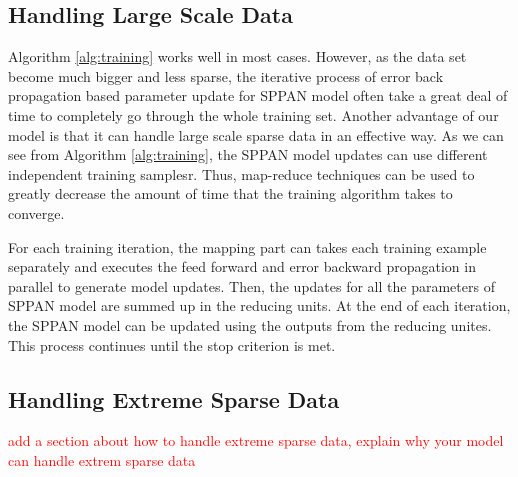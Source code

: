 \subsection{Handling Large Scale  Data}
Algorithm \ref{alg:training} works well in most cases. However, as the
data set become much bigger and less sparse, the iterative process of
error back propagation based parameter update for SPPAN model often
take a great deal of time to completely go through the whole training
set.  Another advantage of our model is that it can handle large scale
sparse data in an effective way. As we can see from Algorithm
\ref{alg:training}, the SPPAN model updates can use different
independent training samplesr. Thus, map-reduce techniques can be used
to greatly decrease the amount of time that the training algorithm
takes to converge.

For each training iteration, the mapping part can takes each training
example separately and executes the feed forward and error backward
propagation in parallel to generate model updates. Then, the updates
for all the parameters of SPPAN model are summed up in the reducing
units. At the end of each iteration, the SPPAN model can be updated
using the outputs from the reducing unites. This process continues
until the stop criterion is met.


\subsection{Handling Extreme Sparse Data}

\textcolor{red}{add a section about how to handle extreme sparse data,
  explain why your model can handle extrem sparse data}
